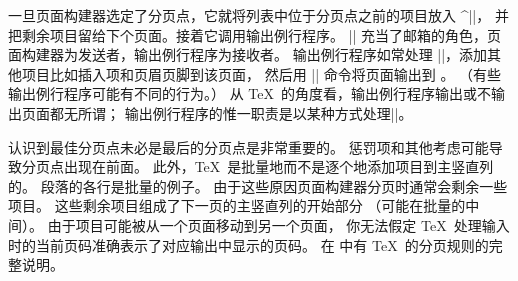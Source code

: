 {{{{{%
{\tighten
一旦页面构建器选定了分页点，它就将列表中位于分页点之前的项目放入 ^||，
并把剩余项目留给下个页面。接着它调用输出例行程序。
|| 充当了邮箱的角色，页面构建器为发送者，输出例行程序为接收者。
输出例行程序如常处理 ||，添加其他项目比如插入项和页眉页脚到该页面，
然后用 |\shipout| 命令将页面输出到 \dvifile 。%
（有些输出例行程序可能有不同的行为。）
%
从 \TeX\ 的角度看，输出例行程序输出或不输出页面都无所谓；
输出例行程序的惟一职责是以某种方式处理||。
\par}

{\tighten
认识到最佳分页点未必是最后的分页点是非常重要的。
惩罚项和其他考虑可能导致分页点出现在前面。
此外，\TeX\ 是批量地而不是逐个地添加项目到主竖直列的。
段落的各行是批量的例子。
由于这些原因页面构建器分页时通常会剩余一些项目。
这些剩余项目组成了下一页的主竖直列的开始部分
（可能在批量的中间）。
由于项目可能被从一个页面移动到另一个页面，
你无法假定 \TeX\ 处理输入时的当前页码准确表示了对应输出中显示的页码。
在 中有 \TeX\ 的分页规则的完整说明。
\par}

}}}}}
